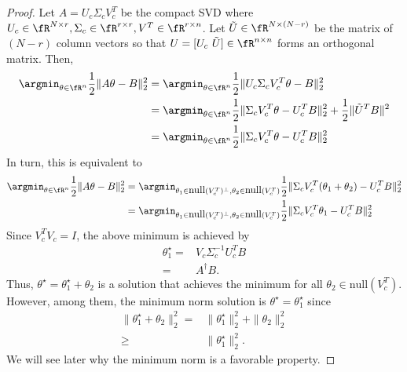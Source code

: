 \documentclass{article}
\begin{document}
\begin{proof}
    Let $A = U_c\Sigma_c V_c^T$ be the compact SVD where $U_c\in\fR^{N\times r}, \Sigma_c\in\fR^{r\times r}, V^T\in \fR^{r\times n}$.
    Let $\tilde{U}\in\fR^{N\times(N-r)}$ be the matrix of $(N-r)$ column vectors so that $U = [U_c~\tilde{U}]\in\fR^{n\times n}$ forms an orthogonal matrix.
    Then,
    \begin{align}
        \argmin_{\theta\in\fR^n} \frac{1}{2}\|A\theta - B\|_2^2 
        &=  \argmin_{\theta\in\fR^n} \frac{1}{2}\|U_c \Sigma_c V_c^T \theta - B\|_2^2\\
        &=  \argmin_{\theta\in\fR^n} \frac{1}{2}\|\Sigma_c V_c^T \theta - U_c^T B\|_2^2 + \frac{1}{2} \|\tilde{U}^TB\|^2\\
        &=  \argmin_{\theta\in\fR^n} \frac{1}{2}\|\Sigma_c V_c^T \theta - U_c^T B\|_2^2
    \end{align}
    In turn, this is equivalent to 
    \begin{align}
        \argmin_{\theta\in\fR^n} \frac{1}{2}\|A\theta - B\|_2^2 
        &=  \argmin_{\theta_1\in\mbox{null}(V_c^T)^\perp, \theta_2\in\mbox{null}(V_c^T)} \frac{1}{2}\|\Sigma_c V_c^T (\theta_1+\theta_2) - U_c^T B\|_2^2\\
        &=  \argmin_{\theta_1\in\mbox{null}(V_c^T)^\perp, \theta_2\in\mbox{null}(V_c^T)} \frac{1}{2}\|\Sigma_c V_c^T \theta_1 - U_c^T B\|_2^2\\
    \end{align}
    Since $V_c^TV_c = I$, the above minimum is achieved by
    \begin{align}
        \theta_1^\star =& V_c\Sigma_c^{-1}U_c^T B\\
        =& A^\dagger B.
    \end{align}
    Thus, $\theta^\star = \theta_1^\star + \theta_2$ is a solution that achieves the minimum for all $\theta_2\in\mbox{null}(V_c^T)$.
    However, among them, the minimum norm solution is $\theta^\star = \theta_1^\star$ since
    \begin{align}
        \|\theta_1^\star + \theta_2\|_2^2 =& \|\theta_1^\star\|_2^2 + \|\theta_2\|_2^2\\
        \geq& \|\theta_1^\star\|_2^2.
    \end{align}
    We will see later why the minimum norm is a favorable property.
        
\end{proof}
\end{document}
